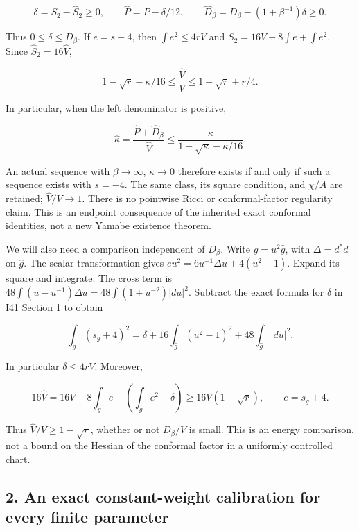 \documentclass[
  11pt,
]{article}
\begin{document}
\[
 \delta=S_2-\widehat S_2\ge0,\qquad
 \widehat P=P-\delta/12,\qquad
 \widehat D_\beta=D_\beta-(1+\beta^{-1})\delta\ge0.
 \tag{1.2}
\]

Thus \(0\le\delta\le D_\beta\). If \(e=s+4\), then \(\int e^2\le4rV\)
and \(S_2=16V-8\int e+\int e^2\). Since \(\widehat S_2=16\widehat V\),

\[
 1-\sqrt r-\kappa/16
 \le\frac{\widehat V}{V}
 \le1+\sqrt r+r/4.
 \tag{1.3}
\]

In particular, when the left denominator is positive,

\[
 \boxed{\widehat\kappa
 =\frac{\widehat P+\widehat D_\beta}{\widehat V}
 \le\frac{\kappa}{1-\sqrt\kappa-\kappa/16}.}
 \tag{1.4}
\]

An actual sequence with \(\beta\to\infty\), \(\kappa\to0\) therefore
exists if and only if such a sequence exists with \(s=-4\). The same
class, its square condition, and \(\chi/A\) are retained;
\(\widehat V/V\to1\). There is no pointwise Ricci or conformal-factor
regularity claim. This is an endpoint consequence of the inherited exact
conformal identities, not a new Yamabe existence theorem.

We will also need a comparison independent of \(D_\beta\). Write
\(g=u^2\widehat g\), with \(\Delta=d^*d\) on \(\widehat g\). The scalar
transformation gives \(e u^2=6u^{-1}\Delta u+4(u^2-1)\). Expand its
square and integrate. The cross term is
\(48\int(u-u^{-1})\Delta u =48\int(1+u^{-2})|du|^2\). Subtract the exact
formula for \(\delta\) in I41 Section 1 to obtain

\[
 \boxed{\int_g(s_g+4)^2=\delta
 +16\int_{\widehat g}(u^2-1)^2+48\int_{\widehat g}|du|^2.}
 \tag{1.5}
\]

In particular \(\delta\le4rV\). Moreover,

\[
16\widehat V=16V-8\int_g e+\left(\int_g e^2-\delta\right)
\ge16V(1-\sqrt r),\qquad e=s_g+4.
\tag{1.6}
\]

Thus \(\widehat V/V\ge1-\sqrt r\), whether or not \(D_\beta/V\) is
small. This is an energy comparison, not a bound on the Hessian of the
conformal factor in a uniformly controlled chart.

\hypertarget{an-exact-constant-weight-calibration-for-every-finite-parameter}{%
\subsection{2. An exact constant-weight calibration for every finite
parameter}\label{an-exact-constant-weight-calibration-for-every-finite-parameter}}
\end{document}
